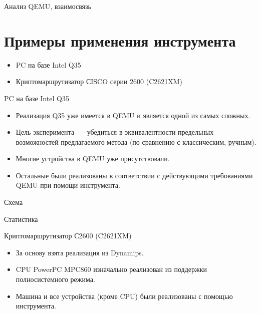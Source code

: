 \documentclass[unicode,hyperref={unicode=true}]{beamer}
\newcommand*{\sectionpagekb}{\usebeamertemplate*{section page kb}}
\theoremstyle{definition}
\theoremstyle{plain}
\begin{document}
\begin{frame}{Анализ QEMU, взаимосвязь}
\end{frame}



\section{Примеры применения инструмента}
\begin{frame}
\sectionpagekb
\begin{itemize}
\item PC на базе Intel Q35
\item Криптомаршрутизатор СISCO серии 2600 (C2621XM)
\end{itemize}
\end{frame}



\begin{frame}{PC на базе Intel Q35}
\begin{itemize}
\item Реализация Q35 уже имеется в QEMU и является одной из самых сложных.
\item Цель эксперимента~--- убедиться в эквивалентности предельных возможностей
предлагаемого метода (по сравнению с классическим, ручным).
\item Многие устройства в QEMU уже присутствовали.
\item Остальные были реализованы в соответствии с действующими требованиями
QEMU при помощи инструмента.
\end{itemize}
\end{frame}



\begin{frame}{}
Схема
\end{frame}



\begin{frame}{}
Статистика
\end{frame}



\begin{frame}{Криптомаршрутизатор С2600 (C2621XM)}
\begin{itemize}
\item За основу взята реализация из Dynamips.
\item CPU PowerPC MPC860 изначально реализован из поддержки полносистемного
режима.
\item Машина и все устройства (кроме CPU) были реализованы с помощью
инструмента.
\end{itemize}
\end{frame}
\end{document}

